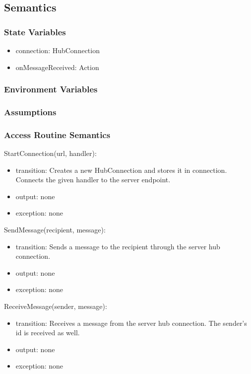 \documentclass[12pt, titlepage]{article}
\begin{document}
\subsection{Semantics}

\subsubsection{State Variables}

\begin{itemize}
\item connection: HubConnection
\item onMessageReceived: Action
\end{itemize}

\subsubsection{Environment Variables}

\subsubsection{Assumptions}

\subsubsection{Access Routine Semantics}

\noindent StartConnection(url, handler):
\begin{itemize}
\item transition: Creates a new HubConnection and stores it in connection. Connects the given handler to the server endpoint.
\item output: none
\item exception: none
\end{itemize}

\noindent SendMessage(recipient, message):
\begin{itemize}
\item transition: Sends a message to the recipient through the server hub connection.
\item output: none
\item exception: none
\end{itemize}

\noindent ReceiveMessage(sender, message):
\begin{itemize}
\item transition: Receives a message from the server hub connection. The sender's id is received as well.
\item output: none
\item exception: none
\end{itemize}
\end{document}
